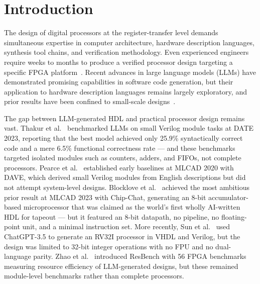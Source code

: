 \documentclass[conference]{IEEEtran}
\begin{document}
\section{Introduction}

The design of digital processors at the register-transfer level demands simultaneous expertise in computer architecture, hardware description languages, synthesis tool chains, and verification methodology. Even experienced engineers require weeks to months to produce a verified processor design targeting a specific FPGA platform~\cite{patterson2017cod}. Recent advances in large language models (LLMs) have demonstrated promising capabilities in software code generation, but their application to hardware description languages remains largely exploratory, and prior results have been confined to small-scale designs~\cite{thakur2023date, blocklove2023chipchat, pearce2020dave, sun2024hdlgen, zhao2025resbench}.

The gap between LLM-generated HDL and practical processor design remains vast. Thakur et al.~\cite{thakur2023date} benchmarked LLMs on small Verilog module tasks at DATE 2023, reporting that the best model achieved only 25.9\% syntactically correct code and a mere 6.5\% functional correctness rate --- and these benchmarks targeted isolated modules such as counters, adders, and FIFOs, not complete processors. Pearce et al.~\cite{pearce2020dave} established early baselines at MLCAD 2020 with DAVE, which derived small Verilog modules from English descriptions but did not attempt system-level designs. Blocklove et al.~\cite{blocklove2023chipchat} achieved the most ambitious prior result at MLCAD 2023 with Chip-Chat, generating an 8-bit accumulator-based microprocessor that was claimed as the world's first wholly AI-written HDL for tapeout --- but it featured an 8-bit datapath, no pipeline, no floating-point unit, and a minimal instruction set. More recently, Sun et al.~\cite{sun2024hdlgen} used ChatGPT-3.5 to generate an RV32I processor in VHDL and Verilog, but the design was limited to 32-bit integer operations with no FPU and no dual-language parity. Zhao et al.~\cite{zhao2025resbench} introduced ResBench with 56 FPGA benchmarks measuring resource efficiency of LLM-generated designs, but these remained module-level benchmarks rather than complete processors.
\end{document}
